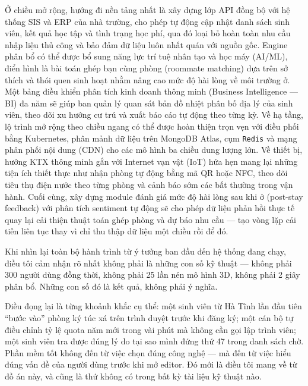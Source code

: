 \documentclass[../DoAn.tex]{subfiles}
\begin{document}
Ở chiều mở rộng, hướng đi nền tảng nhất là xây dựng lớp API đồng bộ với hệ
thống SIS và ERP của nhà trường, cho phép tự động cập nhật danh sách sinh viên,
kết quả học tập và tình trạng học phí, qua đó loại bỏ hoàn toàn nhu cầu nhập
liệu thủ công và bảo đảm dữ liệu luôn nhất quán với nguồn gốc. Engine phân bổ
có thể được bổ sung năng lực trí tuệ nhân tạo và học máy (AI/ML), điển hình là
bài toán ghép bạn cùng phòng (roommate matching) dựa trên sở thích và thói quen
sinh hoạt nhằm nâng cao mức độ hài lòng về môi trường ở. Một bảng điều khiển
phân tích kinh doanh thông minh (Business Intelligence --- BI) đa năm sẽ giúp
ban quản lý quan sát bản đồ nhiệt phân bố địa lý của sinh viên, theo dõi xu
hướng cư trú và xuất báo cáo tự động theo từng kỳ. Về hạ tầng, lộ trình mở
rộng theo chiều ngang có thể được hoàn thiện trọn vẹn với điều phối bằng
Kubernetes, phân mảnh dữ liệu trên MongoDB Atlas, cụm \texttt{Redis} và mạng
phân phối nội dung (CDN) cho các mô hình ba chiều dung lượng lớn. Về thiết bị,
hướng KTX thông minh gắn với Internet vạn vật (IoT) hứa hẹn mang lại những
tiện ích thiết thực như nhận phòng tự động bằng mã QR hoặc NFC, theo dõi tiêu
thụ điện nước theo từng phòng và cảnh báo sớm các bất thường trong vận hành.
Cuối cùng, xây dựng module đánh giá mức độ hài lòng sau khi ở (post-stay
feedback) với phân tích sentiment tự động sẽ cho phép dữ liệu phản hồi thực tế
quay lại cải thiện thuật toán ghép phòng và dự báo nhu cầu --- tạo vòng lặp cải
tiến liên tục thay vì chỉ thu thập dữ liệu một chiều rồi để đó.

Khi nhìn lại toàn bộ hành trình từ ý tưởng ban đầu đến hệ thống đang chạy, điều
tôi cảm nhận rõ nhất không phải là những con số kỹ thuật --- không phải 300
người dùng đồng thời, không phải 25 lần nén mô hình 3D, không phải 2 giây phân
bổ. Những con số đó là kết quả, không phải ý nghĩa.

Điều đọng lại là từng khoảnh khắc cụ thể: một sinh viên từ Hà Tĩnh lần đầu
tiên ``bước vào'' phòng ký túc xá trên trình duyệt trước khi đăng ký; một cán
bộ tự điều chỉnh tỷ lệ quota năm mới trong vài phút mà không cần gọi lập trình
viên; một sinh viên tra được đúng lý do tại sao mình đứng thứ 47 trong danh
sách chờ. Phần mềm tốt không đến từ việc chọn đúng công nghệ --- mà đến từ
việc hiểu đúng vấn đề của người dùng trước khi mở editor. Đó mới là điều tôi
mang về từ đồ án này, và cũng là thứ không có trong bất kỳ tài liệu kỹ thuật
nào.
\end{document}
